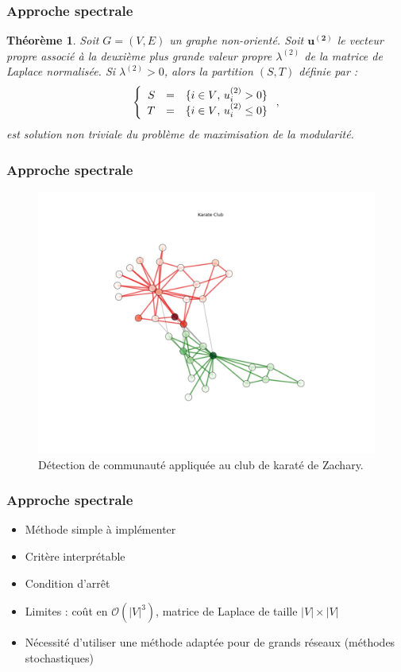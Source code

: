 \documentclass[c]{beamer}
\newtheorem*{theofr}{Théorème}
\begin{document}
\begin{frame}
    \frametitle{Approche spectrale}

    \begin{theofr}
        Soit $G = (V, E)$ un graphe non-orienté. Soit $\mathbf{u^{(2)}}$ le vecteur
        propre associé à la deuxième plus grande valeur propre $\lambda^{(2)}$
        de la matrice de Laplace normalisée. Si $\lambda^{(2)} > 0$, alors la
        partition $(S, T)$ définie par :
        \[
            \left\{
                \begin{array}{r c l}
                    S & = & \{ i \in V \text{, } u^{(2)}_i > 0 \} \\
                    T & = & \{ i \in V \text{, } u^{(2)}_i \leq 0 \}
                \end{array}
            \right. ,
        \]
        est solution non triviale du problème de maximisation de la modularité.

    \end{theofr}

\end{frame}

\begin{frame}
    \frametitle{Approche spectrale}
    \begin{figure}
        \includegraphics[width=.7\textwidth]{./figures/karate_club_split.png}
        \caption{Détection de communauté appliquée au club de karaté de
        Zachary.}
    \end{figure}
\end{frame}

\begin{frame}
    \frametitle{Approche spectrale}
    \begin{itemize}
        \item Méthode simple à implémenter
        \item Critère interprétable
        \item Condition d'arrêt
        \item Limites : coût en $\mathcal{O} (|V|^3)$, matrice de Laplace de
            taille $|V| \times |V|$
        \item Nécessité d'utiliser une méthode adaptée pour de grands réseaux
            (méthodes stochastiques)
    \end{itemize}
\end{frame}
\end{document}
